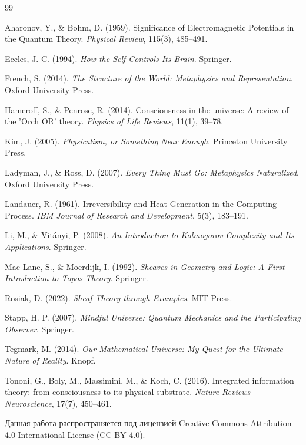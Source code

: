 \documentclass[12pt,a4paper]{article}
\begin{document}
\begin{thebibliography}{99}

Aharonov, Y., \& Bohm, D. (1959). Significance of Electromagnetic Potentials in the Quantum Theory. \textit{Physical Review}, 115(3), 485--491.

Eccles, J. C. (1994). \textit{How the Self Controls Its Brain}. Springer.

French, S. (2014). \textit{The Structure of the World: Metaphysics and Representation}. Oxford University Press.

Hameroff, S., \& Penrose, R. (2014). Consciousness in the universe: A review of the 'Orch OR' theory. \textit{Physics of Life Reviews}, 11(1), 39--78.

Kim, J. (2005). \textit{Physicalism, or Something Near Enough}. Princeton University Press.

Ladyman, J., \& Ross, D. (2007). \textit{Every Thing Must Go: Metaphysics Naturalized}. Oxford University Press.

Landauer, R. (1961). Irreversibility and Heat Generation in the Computing Process. \textit{IBM Journal of Research and Development}, 5(3), 183--191.

Li, M., \& Vitányi, P. (2008). \textit{An Introduction to Kolmogorov Complexity and Its Applications}. Springer.

Mac Lane, S., \& Moerdijk, I. (1992). \textit{Sheaves in Geometry and Logic: A First Introduction to Topos Theory}. Springer.

Rosiak, D. (2022). \textit{Sheaf Theory through Examples}. MIT Press.

Stapp, H. P. (2007). \textit{Mindful Universe: Quantum Mechanics and the Participating Observer}. Springer.

Tegmark, M. (2014). \textit{Our Mathematical Universe: My Quest for the Ultimate Nature of Reality}. Knopf.

Tononi, G., Boly, M., Massimini, M., \& Koch, C. (2016). Integrated information theory: from consciousness to its physical substrate. \textit{Nature Reviews Neuroscience}, 17(7), 450--461.

\end{thebibliography}

Данная работа распространяется под лицензией Creative Commons Attribution 4.0 International License (CC-BY 4.0).
\end{document}
